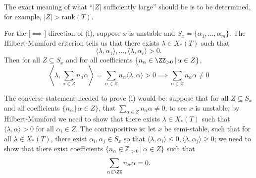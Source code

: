 \documentclass[12pt]{amsart}
\theoremstyle{plain}
\begin{document}
The exact meaning of what ``$|Z|$ sufficiently large'' should be is to be determined, for example, $|Z| > \mathrm{rank}(T)$.

For the [$\implies$] direction of (i), suppose $x$ is unstable and $S_x = \{\alpha_1, \ldots, \alpha_m\}$.
The Hilbert-Mumford criterion tells us that there exists $\lambda \in X_*(T)$ such that 
$$\langle \lambda, \alpha_1 \rangle, \ldots, \langle \lambda, \alpha_r \rangle > 0.$$
Then for all $Z \subseteq S_x$ and for all coefficients $\{n_\alpha \in \ZZ_{>0} \, | \, \alpha \in Z\}$,
$$\left\langle\lambda, \sum_{\alpha \in Z}  n_\alpha  \alpha \right \rangle
= \sum_{\alpha \in Z} n_\alpha  \langle \lambda, \alpha \rangle > 0 \implies \sum_{\alpha \in Z}  n_\alpha  \alpha \ne 0$$

The converse statement needed to prove (i) would be: 
suppose that for all $Z \subseteq S_x$ and all coefficients $\{n_\alpha \, | \, \alpha \in Z\}$, that $\sum_{\alpha \in Z} n_\alpha \alpha \ne 0$; to see $x$ is unstable, by Hilbert-Mumford we need to show that there exists $\lambda \in X_*(T)$ such that $\langle \lambda, \alpha \rangle > 0$ for all $\alpha_i \in Z$.
The contrapositive is: 
let $x$ be semi-stable, such that for all $\lambda \in X_*(T)$, there exist $\alpha_i, \alpha_j \in S_x$ so that $\langle \lambda, \alpha_i \rangle \le 0, \langle \lambda, \alpha_j \rangle \ge 0$; 
we need to show that there exist coefficients $\{n_\alpha \in \mathbb{Z}_{>0} \, | \, \alpha \in Z\}$ such that 
$$\sum_{\alpha \in \ZZ} n_\alpha \alpha = 0.$$
\end{document}
